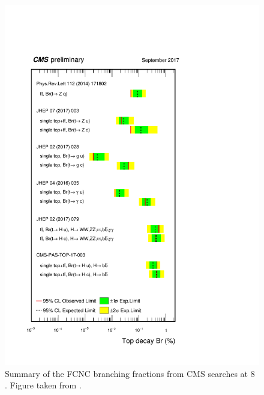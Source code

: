 \begin{figure}[htbp]
	\centering
	\includegraphics[width=.7\linewidth]{1_Introduction/Figures/summary_FCNC.pdf}
	\caption{Summary of the FCNC branching fractions from CMS searches at 8 \TeV. Figure taken from \cite{summarywiki}.}
	\label{fig:summaryfcnc}
\end{figure}




